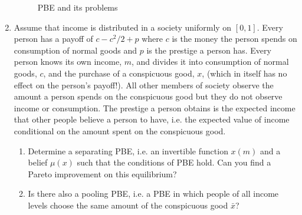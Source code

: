 \documentclass[a4paper,12pt]{article}
\begin{document}
\begin{enumerate}[resume]
\begin{figure}[h]
\caption{PBE and its problems}
\label{fig:ex1}
\end{figure}
\item Assume that income is distributed in a society uniformly on $[0,1]$. Every person has a payoff of $c-c^2/2+p$ where $c$ is the money the person spends on consumption of normal goods and $p$ is the prestige a person has. Every person knows its own income, $m$, and divides it into consumption of normal goods, $c$, and the purchase of a conspicuous good, $x$, (which in itself has no effect on the person's payoff!). All other members of society observe the amount a person spends on the conspicuous good but they do not observe income or consumption. The prestige a person obtains is the expected income that other people believe a person to have, i.e. the expected value of income conditional on the amount spent on the conspicuous good.
  \begin{enumerate}
  \item Determine a separating PBE, i.e. an invertible function $x(m)$ and a belief $\mu(x)$ such that the conditions of PBE hold. Can you find a Pareto improvement on this equilibrium?
  \item Is there also a pooling PBE, i.e. a PBE in which people of all income levels choose the same amount of the conspicuous good $\bar x$?
  \end{enumerate}

\end{enumerate}
\end{document}
